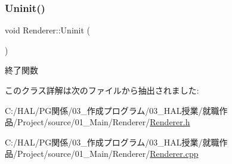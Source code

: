 \subsubsection{\texorpdfstring{Uninit()}{Uninit()}}
{\footnotesize\ttfamily void Renderer\+::\+Uninit (\begin{DoxyParamCaption}{ }\end{DoxyParamCaption})}



終了関数 



このクラス詳解は次のファイルから抽出されました\+:\begin{DoxyCompactItemize}
\item 
C\+:/\+H\+A\+L/\+P\+G関係/03\+\_\+作成プログラム/03\+\_\+\+H\+A\+L授業/就職作品/\+Project/source/01\+\_\+\+Main/\+Renderer/\mbox{\hyperlink{_renderer_8h}{Renderer.\+h}}\item 
C\+:/\+H\+A\+L/\+P\+G関係/03\+\_\+作成プログラム/03\+\_\+\+H\+A\+L授業/就職作品/\+Project/source/01\+\_\+\+Main/\+Renderer/\mbox{\hyperlink{_renderer_8cpp}{Renderer.\+cpp}}\end{DoxyCompactItemize}
